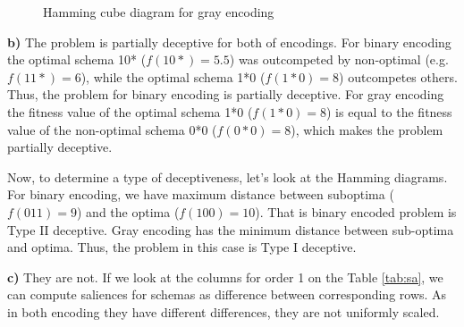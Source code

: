 \documentclass[12pt, a4paper]{article}
\begin{document}
        \begin{figure}[H]
            \centering
            \caption{Hamming cube diagram for gray encoding}
            \label{fig:hamm_gray}
        \end{figure}

        {\bf b)} The problem is partially deceptive for both of encodings. For binary
        encoding the optimal schema 10* ($f(10*) = 5.5$) was outcompeted by non-optimal
        (e.g. $f(11*) = 6$), while the optimal schema 1*0 ($f(1*0) = 8$) outcompetes
        others. Thus, the problem for binary encoding is partially deceptive. For gray
        encoding the fitness value of the optimal schema 1*0 ($f(1*0) = 8$) is equal
        to the fitness value of the non-optimal schema 0*0 ($f(0*0) = 8$), which makes
        the problem partially deceptive.

        Now, to determine a type of deceptiveness, let's
        look at the Hamming diagrams. For binary encoding, we have maximum distance between
        suboptima ($f(011) = 9$) and the optima ($f(100) = 10$). That is binary encoded
        problem is Type II deceptive. Gray encoding has the minimum distance between sub-optima
        and optima. Thus, the problem in this case is Type I deceptive.

        {\bf c)} They are not. If we look at the columns for order 1 on the Table \ref{tab:sa},
        we can compute saliences for schemas as difference between corresponding rows. As in
        both encoding they have different differences, they are not uniformly scaled.
\end{document}
